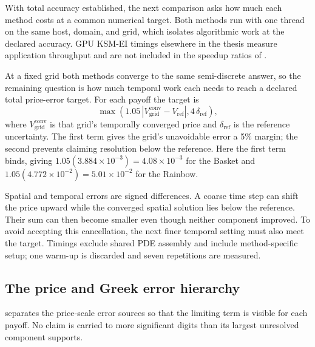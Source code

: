 With total accuracy established, the next comparison asks how much each method costs at a common numerical target. Both methods run with one thread on the same host, domain, and grid, which isolates algorithmic work at the declared accuracy. GPU KSM-EI timings elsewhere in the thesis measure application throughput and are not included in the speedup ratios of .

At a fixed grid both methods converge to the same semi-discrete answer, so the remaining question is how much temporal work each needs to reach a declared total price-error target. For each payoff the target is
\[
\max\!\left(1.05\,|V_{\mathrm{grid}}^{\mathrm{conv}}-V_{\mathrm{ref}}|,
4\,\delta_{\mathrm{ref}}\right),
\]
where $V_{\mathrm{grid}}^{\mathrm{conv}}$ is that grid's temporally converged price and $\delta_{\mathrm{ref}}$ is the reference uncertainty. The first term gives the grid's unavoidable error a 5\% margin; the second prevents claiming resolution below the reference. Here the first term binds, giving $1.05(3.884\times10^{-3})=4.08\times10^{-3}$ for the Basket and $1.05(4.772\times10^{-2})=5.01\times10^{-2}$ for the Rainbow.

Spatial and temporal errors are signed differences. A coarse time step can shift the price upward while the converged spatial solution lies below the reference. Their sum can then become smaller even though neither component improved. To avoid accepting this cancellation, the next finer temporal setting must also meet the target. Timings exclude shared PDE assembly and include method-specific setup; one warm-up is discarded and seven repetitions are measured.

\subsection{The price and Greek error hierarchy}\label{sec:validation-budget}

 separates the price-scale error sources so that the limiting term is visible for each payoff. No claim is carried to more significant digits than its largest unresolved component supports.

